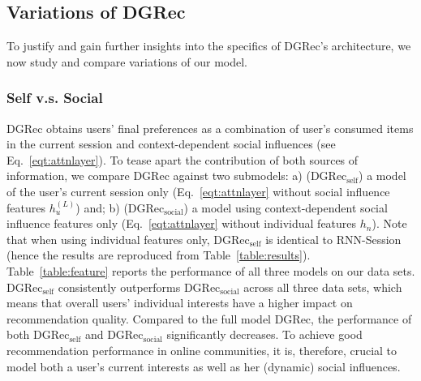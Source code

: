 \documentclass[sigconf]{acmart}
\begin{document}
\subsection{Variations of \gls{DGRec}}
To justify and gain further insights into the specifics of \gls{DGRec}'s architecture, we now study and compare variations of our model. 
\subsubsection{Self v.s. Social} \gls{DGRec} obtains users' final preferences as a combination of user's consumed items in the current session and context-dependent social influences (see Eq.\ \ref{eqt:attnlayer}). To tease apart the contribution of both sources of information, we compare \gls{DGRec} against two submodels:
a) (\gls{DGRec}$_\text{self}$) a model of the user's current session only (Eq.\ \ref{eqt:attnlayer} without social influence features $h_{u}^{(L)}$) and; b) (\gls{DGRec}$_\text{social}$) a model using context-dependent social influence features only (Eq.\ \ref{eqt:attnlayer} without individual features $h_n$). Note that when using individual features only, \gls{DGRec}$_\text{self}$ is identical to RNN-Session (hence the results are reproduced from Table~\ref{table:results}).
Table~\ref{table:feature} reports the performance of all three models on our data sets.
\gls{DGRec}$_\text{self}$ consistently outperforms \gls{DGRec}$_\text{social}$ across all three data sets, which means that overall users' individual interests have a higher impact on recommendation quality.
Compared to the full model \gls{DGRec}, the performance of both \gls{DGRec}$_\text{self}$ and \gls{DGRec}$_\text{social}$ significantly decreases. To achieve good recommendation performance in online communities, it is, therefore, crucial to model both a user's current interests as well as her (dynamic) social influences.
\end{document}
